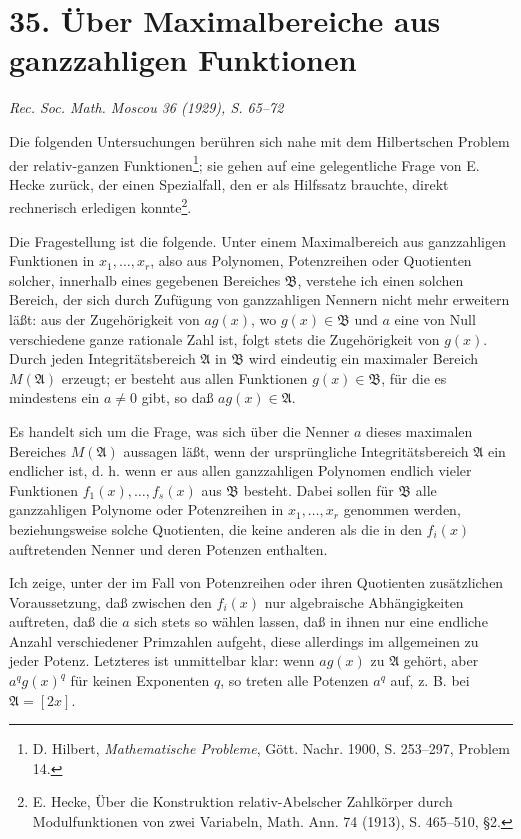 \documentclass[11pt]{article}
\providecommand{\frakA}{\mathfrak A}
\providecommand{\frakB}{\mathfrak B}
\begin{document}
\clearpage

\section*{35. Über Maximalbereiche aus ganzzahligen Funktionen}

\begin{center}
\emph{Rec. Soc. Math. Moscou 36 (1929), S. 65--72}
\end{center}

Die folgenden Untersuchungen berühren sich nahe mit dem Hilbertschen Problem der relativ-ganzen Funktionen\footnote{D. Hilbert, \emph{Mathematische Probleme}, Gött. Nachr. 1900, S. 253--297, Problem 14.}; sie gehen auf eine gelegentliche Frage von E. Hecke zurück, der einen Spezialfall, den er als Hilfssatz brauchte, direkt rechnerisch erledigen konnte\footnote{E. Hecke, Über die Konstruktion relativ-Abelscher Zahlkörper durch Modulfunktionen von zwei Variabeln, Math. Ann. 74 (1913), S. 465--510, §2.}.

Die Fragestellung ist die folgende. Unter einem Maximalbereich aus ganzzahligen Funktionen in \(x_1,\ldots,x_r\), also aus Polynomen, Potenzreihen oder Quotienten solcher, innerhalb eines gegebenen Bereiches \(\frakB\), verstehe ich einen solchen Bereich, der sich durch Zufügung von ganzzahligen Nennern nicht mehr erweitern läßt: aus der Zugehörigkeit von \(a g(x)\), wo \(g(x)\in\frakB\) und \(a\) eine von Null verschiedene ganze rationale Zahl ist, folgt stets die Zugehörigkeit von \(g(x)\). Durch jeden Integritätsbereich \(\frakA\) in \(\frakB\) wird eindeutig ein maximaler Bereich \(M(\frakA)\) erzeugt; er besteht aus allen Funktionen \(g(x)\in\frakB\), für die es mindestens ein \(a\ne0\) gibt, so daß \(a g(x)\in\frakA\).

Es handelt sich um die Frage, was sich über die Nenner \(a\) dieses maximalen Bereiches \(M(\frakA)\) aussagen läßt, wenn der ursprüngliche Integritätsbereich \(\frakA\) ein endlicher ist, d. h. wenn er aus allen ganzzahligen Polynomen endlich vieler Funktionen \(f_1(x),\ldots,f_s(x)\) aus \(\frakB\) besteht. Dabei sollen für \(\frakB\) alle ganzzahligen Polynome oder Potenzreihen in \(x_1,\ldots,x_r\) genommen werden, beziehungsweise solche Quotienten, die keine anderen als die in den \(f_i(x)\) auftretenden Nenner und deren Potenzen enthalten.

Ich zeige, unter der im Fall von Potenzreihen oder ihren Quotienten zusätzlichen Voraussetzung, daß zwischen den \(f_i(x)\) nur algebraische Abhängigkeiten auftreten, daß die \(a\) sich stets so wählen lassen, daß in ihnen nur eine endliche Anzahl verschiedener Primzahlen aufgeht, diese allerdings im allgemeinen zu jeder Potenz. Letzteres ist unmittelbar klar: wenn \(a g(x)\) zu \(\frakA\) gehört, aber \(a^q g(x)^q\) für keinen Exponenten \(q\), so treten alle Potenzen \(a^q\) auf, z. B. bei \(\frakA=[2x]\).
\end{document}
